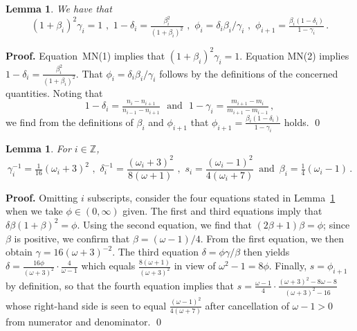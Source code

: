 \documentclass[letterpaper,11pt,oneside,reqno]{amsbook}
\newcommand{\Z}{\ensuremath{\mathbb{Z}}}
\numberwithin{figure}{chapter}
\newtheorem{lemma}[theorem]{Lemma}
\theoremstyle{definition}
\theoremstyle{definition}
\theoremstyle{definition}
\theoremstyle{definition}
\theoremstyle{definition}
\newcommand{\macbeta}{\beta}
\newcommand{\macomega}{\omega}
\newcommand{\macphi}{\phi}
\newcommand{\macgsee}{\gamma}
\newcommand{\macgdee}{\delta}
\newcommand{\mnmac}{\textrm{MN}}
\begin{document}
  
\begin{lemma}\label{l.fourfacts}
We have that 
$$
 (1 + \macbeta_i)^2  \macgsee_i = 1 \, \, , \, \, 1 - \macgdee_i = \tfrac{\macbeta_i^2}{(1+\macbeta_i)^2} \, \, ,  \, \, \macphi_i = \macgdee_i\macbeta_i/\macgsee_i \, \, , \, \, \macphi_{i+1} = \tfrac{\macbeta_i(1-\macgdee_i)}{1-\macgsee_i} \, . 
$$
\end{lemma}
{\bf Proof.} Equation~\mnmac(1) implies that  $(1 + \macbeta_i)^2  \macgsee_i = 1$. Equation \mnmac(2) implies  $1 - \macgdee_i = \tfrac{\macbeta_i^2}{(1+\macbeta_i)^2}$. That $\macphi_i = \macgdee_i\macbeta_i/\macgsee_i$ follows by the definitions of the concerned quantities.  
Noting that 
$$
1 - \macgdee_i = \tfrac{n_i - n_{i+1}}{n_{i-1} - n_{i+1}} \, \, \, \, \textrm{and}  \, \, \, \, 1 - \macgsee_i = \tfrac{m_{i+1} - m_i}{m_{i+1} - m_{i-1}} \, ,
$$
we find from the definitions of $\macbeta_i$ and $\macphi_{i+1}$
that $\macphi_{i+1} = \tfrac{\macbeta_i(1-\macgdee_i)}{1-\macgsee_i}$ holds. \qed

\begin{lemma}\label{l.omegai}
For $i \in \Z$,
$$
\macgsee_i^{-1}   =   \tfrac{1}{16} (\macomega_i + 3)^2 \, \, , \, \,
 \macgdee_i^{-1}  =  \frac{(\macomega_i + 3)^2}{8(\macomega + 1)} \, \, , \, \, s_i   =  \frac{(\macomega_i - 1)^2}{4(\macomega_i + 7)}  \, \, \, \textrm{and} \, \, \,
\macbeta_i  =  \tfrac{1}{4} (\macomega_i - 1)
 \, .
 $$
 \end{lemma}
{\bf Proof.} Omitting $i$ subscripts, consider the four equations stated in Lemma~\ref{l.fourfacts} when we take $\macphi \in (0,\infty)$ given. The first and third equations imply that $\macgdee\macbeta(1+\macbeta)^2 = \macphi$. Using the second equation, we find that $(2\macbeta+1)\macbeta = \macphi$; since $\macbeta$ is positive, we confirm that $\macbeta = (\macomega -1)/4$. From the first equation, we then obtain $\macgsee = 16(\macomega +3)^{-2}$. The third equation $\macgdee = \macphi\macgsee/\macbeta$ then yields $\macgdee = \tfrac{16\macphi}{(\macomega +3)^2} \cdot \tfrac{4}{\macomega -1}$ which equals $\tfrac{8(\macomega +1)}{(\macomega +3)^2}$ in view of $\macomega^2 -1 = 8\macphi$. Finally, $s = \macphi_{i+1}$ by definition, so that the fourth equation implies that
$s = \tfrac{\macomega -1}{4} \cdot \tfrac{(\macomega+3)^2 - 8\macomega - 8}{(\macomega+3)^2 - 16}$ whose right-hand side is seen to equal $\tfrac{(\macomega -1)^2}{4(\macomega+7)}$ after cancellation of $\macomega - 1 > 0$
from numerator and denominator.  \qed
\end{document}
